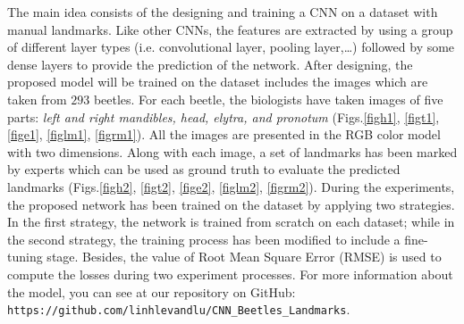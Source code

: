 \documentclass[review]{elsarticle}
\begin{document}
The main idea consists of the designing and training a CNN \cite{lecun2010convolutional} on a dataset with manual landmarks. Like other CNNs, the features are extracted by using a group of different layer types (i.e. convolutional layer, pooling layer,\ldots) followed by some dense layers to provide the prediction of the network. After designing, the proposed model will be trained on the dataset includes the images which are taken from $293$ beetles. For each beetle, the biologists have taken images of five parts: \textit{left and right mandibles, head, elytra, and pronotum} (Figs.\ref{figh1}, \ref{figt1}, \ref{fige1}, \ref{figlm1}, \ref{figrm1}). All the images are presented in the RGB color model with two dimensions. Along with each image, a set of landmarks has been marked by experts which can be used as ground truth to evaluate the predicted landmarks (Figs.\ref{figh2}, \ref{figt2}, \ref{fige2}, \ref{figlm2}, \ref{figrm2}). During the experiments, the proposed network has been trained on the dataset by applying two strategies. In the first strategy, the network is trained from scratch on each dataset; while in the second strategy, the training process has been modified to include a fine-tuning \cite{yosinski2014transferable} stage. Besides, the value of Root Mean Square Error (RMSE) is used to compute the losses during two experiment processes. For more information about the model, you can see at our repository on GitHub: \texttt{https://github.com/linhlevandlu/CNN\_Beetles\_Landmarks}.
\end{document}
